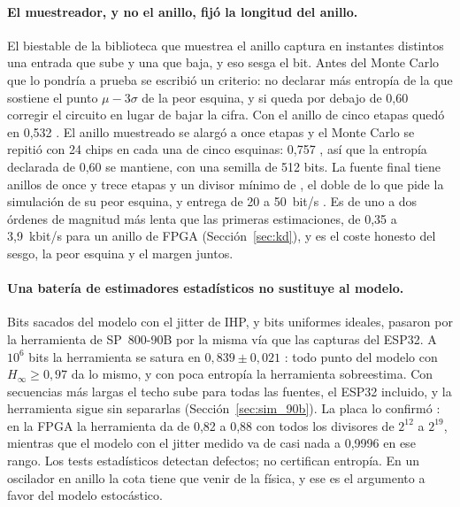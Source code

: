 \paragraph{El muestreador, y no el anillo, fijó la longitud del anillo.}
El biestable de la biblioteca que muestrea el anillo captura en instantes
distintos una entrada que sube y una que baja, y eso sesga el bit. Antes
del Monte Carlo que lo pondría a prueba se escribió un criterio: no
declarar más entropía de la que sostiene el punto $\mu - 3\sigma$ de la
peor esquina, y si queda por debajo de 0,60 corregir el circuito en lugar
de bajar la cifra. Con el anillo de cinco etapas quedó en 0,532 \simu{}.
El anillo muestreado se alargó a once etapas y el Monte Carlo se repitió
con 24 chips en cada una de cinco esquinas: 0,757 \simu{}, así que la
entropía declarada de 0,60 se mantiene, con una semilla de 512 bits. La
fuente final tiene anillos de once y trece etapas y un divisor mínimo de
, el doble de lo que pide la simulación de su peor esquina, y
entrega de 20 a 50~bit/s \est{}. Es de uno a dos órdenes de magnitud más
lenta que las primeras estimaciones, de 0,35 a 3,9~kbit/s para un anillo
de \ac{FPGA} \est{} (Sección~\ref{sec:kd}), y es el coste honesto del
sesgo, la peor esquina y el margen juntos.

\paragraph{Una batería de estimadores estadísticos no sustituye al
modelo.} Bits sacados del modelo con el jitter de IHP, y bits uniformes
ideales, pasaron por la herramienta de SP~800-90B por la misma vía que las
capturas del ESP32. A $10^6$ bits la herramienta se satura en
$0{,}839 \pm 0{,}021$ \simu{}: todo punto del modelo con
$H_\infty \ge 0{,}97$ da lo mismo, y con poca entropía la herramienta
sobreestima. Con secuencias más largas el techo sube para todas las
fuentes, el ESP32 incluido, y la herramienta sigue sin separarlas
(Sección~\ref{sec:sim_90b}). La placa lo confirmó \meas{}: en la
\ac{FPGA} la herramienta da de 0,82 a 0,88 con todos los divisores de
$2^{12}$ a $2^{19}$, mientras que el modelo con el jitter medido va de
casi nada a 0,9996 en ese rango. Los tests estadísticos detectan
defectos; no certifican entropía. En un oscilador en anillo la cota tiene que venir de
la física, y ese es el argumento a favor del modelo estocástico.


